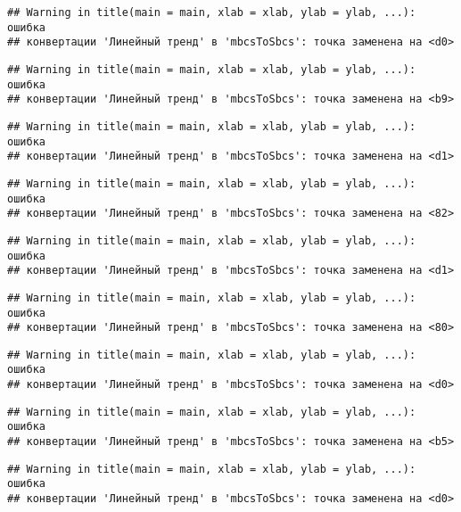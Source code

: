\documentclass[
]{article}
\begin{document}
\begin{verbatim}
## Warning in title(main = main, xlab = xlab, ylab = ylab, ...): ошибка
## конвертации 'Линейный тренд' в 'mbcsToSbcs': точка заменена на <d0>
\end{verbatim}

\begin{verbatim}
## Warning in title(main = main, xlab = xlab, ylab = ylab, ...): ошибка
## конвертации 'Линейный тренд' в 'mbcsToSbcs': точка заменена на <b9>
\end{verbatim}

\begin{verbatim}
## Warning in title(main = main, xlab = xlab, ylab = ylab, ...): ошибка
## конвертации 'Линейный тренд' в 'mbcsToSbcs': точка заменена на <d1>
\end{verbatim}

\begin{verbatim}
## Warning in title(main = main, xlab = xlab, ylab = ylab, ...): ошибка
## конвертации 'Линейный тренд' в 'mbcsToSbcs': точка заменена на <82>
\end{verbatim}

\begin{verbatim}
## Warning in title(main = main, xlab = xlab, ylab = ylab, ...): ошибка
## конвертации 'Линейный тренд' в 'mbcsToSbcs': точка заменена на <d1>
\end{verbatim}

\begin{verbatim}
## Warning in title(main = main, xlab = xlab, ylab = ylab, ...): ошибка
## конвертации 'Линейный тренд' в 'mbcsToSbcs': точка заменена на <80>
\end{verbatim}

\begin{verbatim}
## Warning in title(main = main, xlab = xlab, ylab = ylab, ...): ошибка
## конвертации 'Линейный тренд' в 'mbcsToSbcs': точка заменена на <d0>
\end{verbatim}

\begin{verbatim}
## Warning in title(main = main, xlab = xlab, ylab = ylab, ...): ошибка
## конвертации 'Линейный тренд' в 'mbcsToSbcs': точка заменена на <b5>
\end{verbatim}

\begin{verbatim}
## Warning in title(main = main, xlab = xlab, ylab = ylab, ...): ошибка
## конвертации 'Линейный тренд' в 'mbcsToSbcs': точка заменена на <d0>
\end{verbatim}
\end{document}
